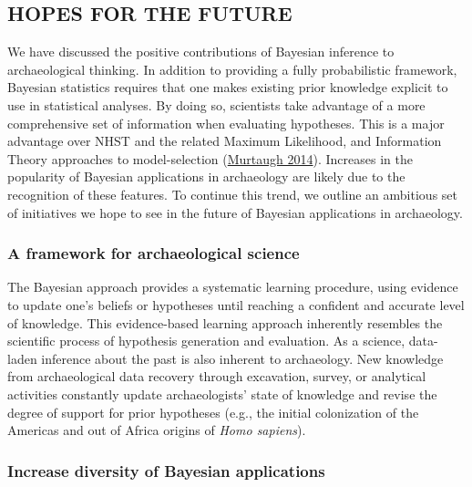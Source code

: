 \documentclass[
]{article}
\begin{document}
\hypertarget{hopes-for-the-future}{%
\subsection{\texorpdfstring{\hfil HOPES FOR THE
FUTURE\hfil}{HOPES FOR THE FUTURE}}\label{hopes-for-the-future}}

We have discussed the positive contributions of Bayesian inference to
archaeological thinking. In addition to providing a fully probabilistic
framework, Bayesian statistics requires that one makes existing prior
knowledge explicit to use in statistical analyses. By doing so,
scientists take advantage of a more comprehensive set of information
when evaluating hypotheses. This is a major advantage over NHST and the
related Maximum Likelihood, and Information Theory approaches to
model-selection (\protect\hyperlink{ref-murtaugh_defense_2014}{Murtaugh
2014}). Increases in the popularity of Bayesian applications in
archaeology are likely due to the recognition of these features. To
continue this trend, we outline an ambitious set of initiatives we hope
to see in the future of Bayesian applications in archaeology.

\hypertarget{a-framework-for-archaeological-science}{%
\subsubsection{A framework for archaeological
science}\label{a-framework-for-archaeological-science}}

The Bayesian approach provides a systematic learning procedure, using
evidence to update one's beliefs or hypotheses until reaching a
confident and accurate level of knowledge. This evidence-based learning
approach inherently resembles the scientific process of hypothesis
generation and evaluation. As a science, data-laden inference about the
past is also inherent to archaeology. New knowledge from archaeological
data recovery through excavation, survey, or analytical activities
constantly update archaeologists' state of knowledge and revise the
degree of support for prior hypotheses (e.g., the initial colonization
of the Americas and out of Africa origins of \emph{Homo sapiens}).

\hypertarget{increase-diversity-of-bayesian-applications}{%
\subsubsection{Increase diversity of Bayesian
applications}\label{increase-diversity-of-bayesian-applications}}
\end{document}
